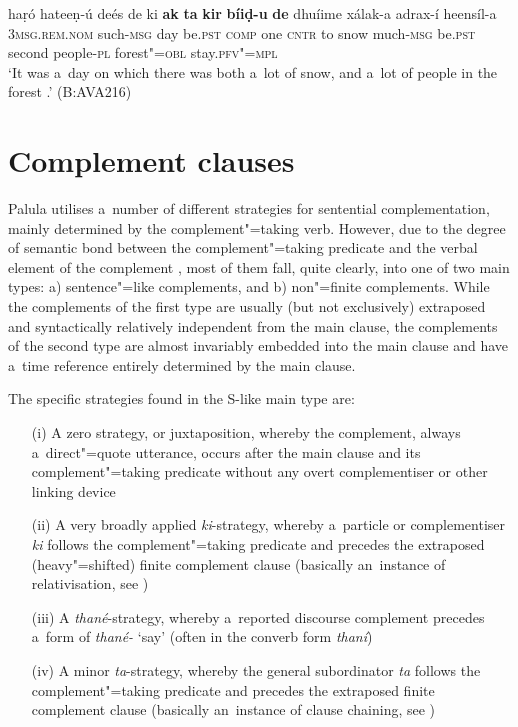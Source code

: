 \begin{exe}
\ex
\label{ex:13-126}
\gll haṛó hateeṇ-ú deés de ki \textbf{ak} \textbf{ta} \textbf{kir} \textbf{bíiḍ-u} \textbf{de} dhuíime xálak-a  adrax-í heensíl-a \\
\textsc{3msg.rem.nom} such-\textsc{msg}  day be.\textsc{pst} \textsc{comp} one \textsc{cntr} to snow much-\textsc{msg} be.\textsc{pst} second people-\textsc{pl}  forest"=\textsc{obl} stay.\textsc{pfv"=mpl} \\
\glt `It was a~day on which there was both a~lot of snow, and a~lot of people in the forest .' (B:AVA216)
\end{exe}

\section{Complement clauses}
\label{sec:13-5}

Palula utilises a~number of different strategies for sentential complementation, mainly determined by the complement"=taking verb. However, due to the degree of semantic bond between the complement"=taking predicate and the verbal element of the complement \citep[39-40]{givon2001b}, most of them fall, quite clearly, into one of two main types: a) sentence"=like complements, and b) non"=finite complements. While the complements of the first type are usually (but not exclusively) extraposed and syntactically relatively independent from the main clause, the complements of the second type are almost invariably embedded into the main clause and have a~time reference entirely determined by the main clause.

The specific strategies found in the S-like main type are:

\begin{enumerate}
\item[(i)] A zero strategy, or juxtaposition, whereby the complement, always a~direct"=quote utterance, occurs after the main clause and its complement"=taking predicate without any overt complementiser or other linking device
\item[(ii)] A very broadly applied \textit{ki}-strategy, whereby a~particle or complementiser \textit{ki} follows the complement"=taking predicate and precedes the extraposed (heavy"=shifted) finite complement clause (basically an~instance of relativisation, see )
\item[(iii)] A \textit{thané}-strategy, whereby a~reported discourse complement precedes a~form of \textit{thané-} `say' (often in the converb form \textit{thaní})
\item[(iv)] A minor \textit{ta}-strategy, whereby the general subordinator \textit{ta} follows the complement"=taking predicate and precedes the extraposed finite complement clause (basically an~instance of clause chaining, see )
\end{enumerate}

